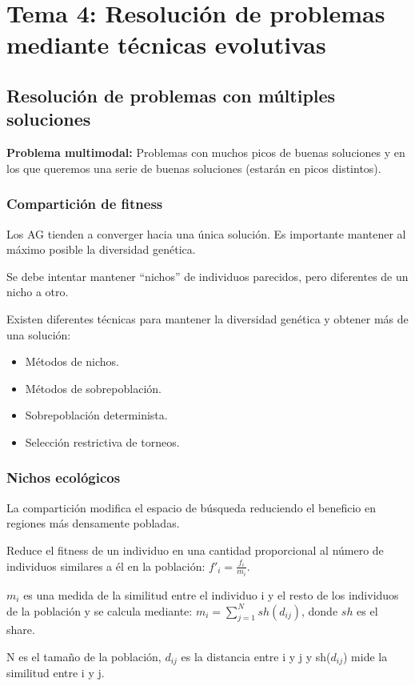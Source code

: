 \documentclass[12pt, twoside, openright]{report} %
\begin{document}
\chapter{Tema 4: Resolución de problemas mediante técnicas evolutivas}
\section{Resolución de problemas con múltiples soluciones}
\textbf{Problema multimodal:} Problemas con muchos picos de buenas soluciones y en los que queremos una serie de buenas soluciones (estarán en picos distintos).

\subsection{Compartición de fitness}
Los AG tienden a converger hacia una única solución. Es importante mantener al máximo posible la diversidad genética.

Se debe intentar mantener “nichos” de individuos parecidos, pero diferentes de un nicho a otro.

Existen diferentes técnicas para mantener la diversidad genética y obtener más de una solución:
\begin{itemize}
	\item Métodos de nichos.
	\item Métodos de sobrepoblación.
	\item Sobrepoblación determinista.
	\item Selección restrictiva de torneos.
\end{itemize}

\subsection{Nichos ecológicos}
La compartición modifica el espacio de búsqueda reduciendo el beneficio en regiones más densamente pobladas.

Reduce el fitness de un individuo en una cantidad proporcional al número de individuos similares a él en la población: $f'_i=\frac{f_i}{m_i}$.

$m_i$ es una medida de la similitud entre el individuo i y el resto de los individuos de la población y se calcula mediante: $m_i= \sum^N_{j=1}sh(d_{ij})$, donde $sh$ es el share.

N es el tamaño de la población, $d_{ij}$ es la distancia entre i y j y sh($d_{ij}$) mide la similitud entre i y j.
\pagebreak
\end{document}
